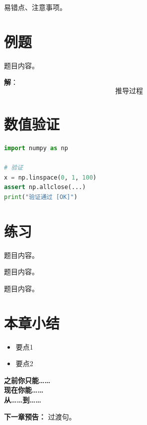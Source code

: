 \begin{notebox}
易错点、注意事项。
\end{notebox}


\section{例题}

\begin{examplebox}[编号]
题目内容。

\textbf{解}：
\[
推导过程
\]
\end{examplebox}


\section{数值验证}

\begin{lstlisting}[language=Python, caption=验证标题]
import numpy as np

# 验证
x = np.linspace(0, 1, 100)
assert np.allclose(...)
print("验证通过 [OK]")
\end{lstlisting}


\section{练习}

\begin{exercise}[易]
题目内容。
\end{exercise}

\begin{exercise}[中]
题目内容。
\end{exercise}

\begin{exercise}[难]
题目内容。
\end{exercise}


\section{本章小结}

\begin{itemize}
  \item 要点1
  \item 要点2
\end{itemize}

\begin{progressbox}
\textbf{之前你只能……}\\[6pt]
\textbf{现在你能……}\\[6pt]
\textbf{从……到……}
\end{progressbox}

\textbf{下一章预告：} 过渡句。
